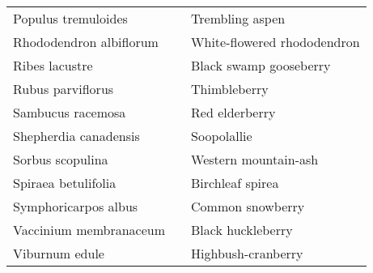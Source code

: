 \documentclass[12pt, letterpaper]{article}
\begin{document}
\begin{longtable}{p{}|p{}|p{}}
  Populus tremuloides & & Trembling aspen \\
  Rhododendron albiflorum & & White-flowered rhododendron \\
  Ribes lacustre & & Black swamp gooseberry \\
  Rubus parviflorus & & Thimbleberry \\
  Sambucus racemosa & & Red elderberry \\
  Shepherdia canadensis & & Soopolallie \\
  Sorbus scopulina & & Western mountain-ash \\
  Spiraea betulifolia & & Birchleaf spirea \\
  Symphoricarpos albus & & Common snowberry \\
  Vaccinium membranaceum & & Black huckleberry \\
  Viburnum edule & & Highbush-cranberry \\
   \hline
\hline
\end{longtable}
\endgroup
\newpage
\end{document}
